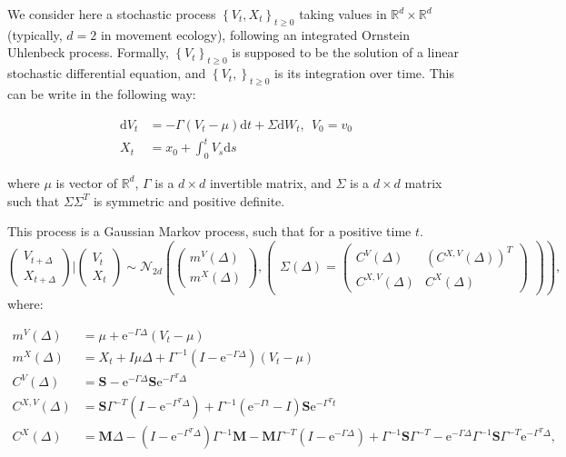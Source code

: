 \documentclass[]{book}
\newcommand{\rmd}{\text{d}}
\newcommand{\e}{\text{e}}
\newcommand{\inv}{^{-1}}
\newcommand{\Sinf}{\mathbf{S}}
\newcommand{\M}{\mathbf{M}}
\begin{document}
We consider here a stochastic process
\(\left\lbrace V_t, X_t \right\rbrace_{t \geq 0}\) taking values in
\(\mathbb{R}^{d}\times \mathbb{R}^{d}\) (typically, \(d = 2\) in
movement ecology), following an integrated Ornstein Uhlenbeck process.
Formally, \(\left\lbrace V_t \right\rbrace_{t \geq 0}\) is supposed to
be the solution of a linear stochastic differential equation, and
\(\left\lbrace V_t, \right\rbrace_{t \geq 0}\) is its integration over
time. This can be write in the following way:

\begin{equation}
\begin{array}{rl}
\rmd V_t &= -\Gamma \left( V_t - \mu \right)\rmd t + \Sigma \rmd W_t,~~V_0 = v_0\\
X_t &= x_0 + \int_0^t V_s \rmd s
\end{array}
\label{eq:IOU-SDE}
\end{equation}

where \(\mu\) is vector of \(\mathbb{R}^d\), \(\Gamma\) is a
\(d \times d\) invertible matrix, and \(\Sigma\) is a \(d \times d\)
matrix such that \(\Sigma\Sigma^T\) is symmetric and positive definite.

This process is a Gaussian Markov process, such that for a positive time
\(t\). \[\begin{pmatrix}
V_{t + \Delta}\\
X_{t + \Delta}
\end{pmatrix} \vert \begin{pmatrix}
V_{t} \\
X_{t}
\end{pmatrix} \sim \mathcal{N}_{2d}\left( \begin{pmatrix}
m^V(\Delta)\\
m^X(\Delta)
\end{pmatrix}, \begin{pmatrix}
\Sigma(\Delta) = \begin{pmatrix}
C^{V}(\Delta) & \left(C^{X, V}(\Delta)\right)^T\\
C^{X, V}(\Delta) & C^{X}(\Delta)
\end{pmatrix}
\end{pmatrix} \right), \] where:

\begin{align*}
m^V(\Delta) &= \mu + \e^{-\Gamma \Delta} (V_t - \mu)\\
m^X(\Delta) &= X_t + I\mu \Delta + \Gamma\inv(I -  \e^{-\Gamma \Delta})(V_t - \mu)\\
 C^V(\Delta) &= \Sinf -\e^{-\Gamma \Delta}\Sinf \e^{-\Gamma^T \Delta}\\
 C^{X,V}(\Delta) &= \Sinf \Gamma^{-T}\left(I - \e^{-\Gamma^T \Delta}\right) + \Gamma\inv\left(\e^{-\Gamma t} - I\right)\Sinf  \e^{-\Gamma^T t}\\
 C^X(\Delta) &= \M \Delta - \left(I - \e^{-\Gamma^T \Delta}\right)\Gamma\inv \M - \M\Gamma^{-T}\left(I - \e^{-\Gamma \Delta}\right)+ \Gamma\inv \Sinf \Gamma^{-T} - 
   \e^{-\Gamma \Delta}\Gamma\inv\Sinf\Gamma^{-T}\e^{-\Gamma^T \Delta},
\end{align*}
\end{document}
